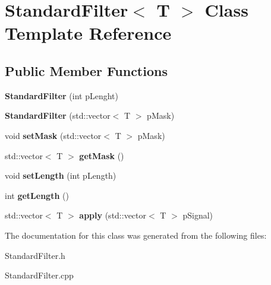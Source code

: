 \hypertarget{class_standard_filter}{\section{Standard\-Filter$<$ T $>$ Class Template Reference}
\label{class_standard_filter}
}
\subsection*{Public Member Functions}
\begin{DoxyCompactItemize}
\item 
\hypertarget{class_standard_filter_ac48640afed19ec602e5cd2673d16f5ae}{{\bfseries Standard\-Filter} (int p\-Lenght)}\label{class_standard_filter_ac48640afed19ec602e5cd2673d16f5ae}

\item 
\hypertarget{class_standard_filter_a380828493a181b61010bb633538b0e7c}{{\bfseries Standard\-Filter} (std\-::vector$<$ T $>$ p\-Mask)}\label{class_standard_filter_a380828493a181b61010bb633538b0e7c}

\item 
\hypertarget{class_standard_filter_abef27f90eea94d34607e24dd026a281e}{void {\bfseries set\-Mask} (std\-::vector$<$ T $>$ p\-Mask)}\label{class_standard_filter_abef27f90eea94d34607e24dd026a281e}

\item 
\hypertarget{class_standard_filter_ab511fb0167d038d75cba52dd936eddd3}{std\-::vector$<$ T $>$ {\bfseries get\-Mask} ()}\label{class_standard_filter_ab511fb0167d038d75cba52dd936eddd3}

\item 
\hypertarget{class_standard_filter_af441d21022cd441f08421de8cd714d53}{void {\bfseries set\-Length} (int p\-Length)}\label{class_standard_filter_af441d21022cd441f08421de8cd714d53}

\item 
\hypertarget{class_standard_filter_ae993492384d41dc26c5f5577607b3b02}{int {\bfseries get\-Length} ()}\label{class_standard_filter_ae993492384d41dc26c5f5577607b3b02}

\item 
\hypertarget{class_standard_filter_a2b6a11ed970216b26bda63857d4ed1fc}{std\-::vector$<$ T $>$ {\bfseries apply} (std\-::vector$<$ T $>$ p\-Signal)}\label{class_standard_filter_a2b6a11ed970216b26bda63857d4ed1fc}

\end{DoxyCompactItemize}


The documentation for this class was generated from the following files\-:\begin{DoxyCompactItemize}
\item 
Standard\-Filter.\-h\item 
Standard\-Filter.\-cpp\end{DoxyCompactItemize}
